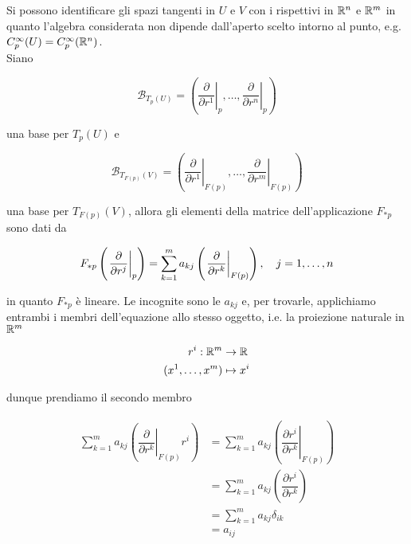 Si possono identificare gli spazi tangenti in $ U $ e $ V $ con i rispettivi in $ \mathbb{R}^{n} $ e $ \mathbb{R}^{m} $ in quanto l'algebra considerata non dipende dall'aperto scelto intorno al punto, e.g. $ C_{p}^{\infty}(U) = C_{p}^{\infty}(\mathbb{R}^{n}) $.\\
Siano

\begin{equation}
	\mathcal{B}_{T_{p}(U)} = \left( \left. \dfrac{\partial}{\partial r^{1}} \right|_{p} , \dots , \left. \dfrac{\partial}{\partial r^{n}} \right|_{p} \right)
\end{equation}

una base per $ T_{p}(U) $ e

\begin{equation}
	\mathcal{B}_{T_{F(p)}(V)} = \left( \left. \dfrac{\partial}{\partial r^{1}} \right|_{F(p)} , \dots , \left. \dfrac{\partial}{\partial r^{m}} \right|_{F(p)} \right)
\end{equation}

una base per $ T_{F(p)}(V) $, allora gli elementi della matrice dell'applicazione $ F_{*p} $ sono dati da

\begin{equation}
	F_{*p} \left( \left. \dfrac{\partial}{\partial r^{j}} \right|_{p} \right) = \sum_{k=1}^{m} a_{kj} \left( \left. \dfrac{\partial}{\partial r^{k}} \right|_{F(p)} \right) \qcomma j=1,\dots,n
\end{equation}

in quanto $ F_{*p} $ è lineare. Le incognite sono le $ a_{kj} $ e, per trovarle, applichiamo entrambi i membri dell'equazione allo stesso oggetto, i.e. la proiezione naturale in $ \mathbb{R}^{m} $

\begin{align}
	\begin{split}
		r^{i} : \mathbb{R}^{m} &\to \mathbb{R}\\
		(x^{1},\dots,x^{m}) &\mapsto x^{i}
	\end{split}
\end{align}

dunque prendiamo il secondo membro

\begin{align}
	\begin{split}
		\sum_{k=1}^{m} a_{kj} \left( \left. \dfrac{\partial}{\partial r^{k}} \right|_{F(p)} r^{i} \right) &= \sum_{k=1}^{m} a_{kj} \left( \left. \dfrac{\partial r^{i}}{\partial r^{k}} \right|_{F(p)} \right)\\
		&= \sum_{k=1}^{m} a_{kj} \left( \dfrac{\partial r^{i}}{\partial r^{k}} \right)\\
		&= \sum_{k=1}^{m} a_{kj} \delta_{ik}\\
		&= a_{ij}
	\end{split}
\end{align}

